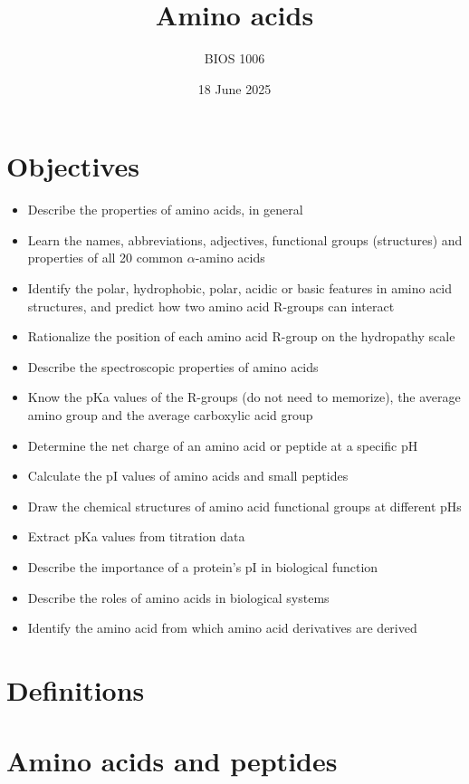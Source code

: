 \documentclass[letterpaper, 12pt]{article}
\title{Amino acids}
\author{BIOS 1006}
\date{18 June 2025}
\begin{document}
\maketitle

\section*{Objectives}

\begin{itemize}
\item Describe the properties of amino acids, in general
\item Learn the names, abbreviations, adjectives, functional groups (structures) and properties of all 20 common $\alpha$-amino acids
\item Identify the polar, hydrophobic, polar, acidic or basic features in amino acid structures, and predict how two amino acid R-groups can interact
\item Rationalize the position of each amino acid R-group on the hydropathy scale
\item Describe the spectroscopic properties of amino acids
\item Know the pKa values of the R-groups (do not need to memorize), the average amino group and the average carboxylic acid group
\item Determine the net charge of an amino acid or peptide at a specific pH
\item Calculate the pI values of amino acids and small peptides
\item Draw the chemical structures of amino acid functional groups at different pHs
\item Extract pKa values from titration data
\item Describe the importance of a protein’s pI in biological function
\item Describe the roles of amino acids in biological systems
\item Identify the amino acid from which amino acid derivatives are derived
\end{itemize}

\newpage

\section*{Definitions}

\newpage

\section*{Amino acids and peptides}
\end{document}
